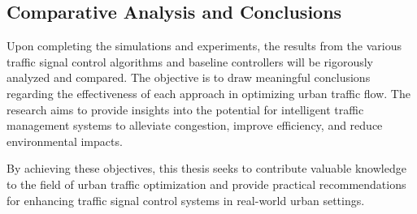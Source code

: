 \subsection{Comparative Analysis and Conclusions}
Upon completing the simulations and experiments, the results from the various traffic signal control algorithms and baseline controllers will be rigorously analyzed and compared. The objective is to draw meaningful conclusions regarding the effectiveness of each approach in optimizing urban traffic flow. The research aims to provide insights into the potential for intelligent traffic management systems to alleviate congestion, improve efficiency, and reduce environmental impacts.

By achieving these objectives, this thesis seeks to contribute valuable knowledge to the field of urban traffic optimization and provide practical recommendations for enhancing traffic signal control systems in real-world urban settings.
